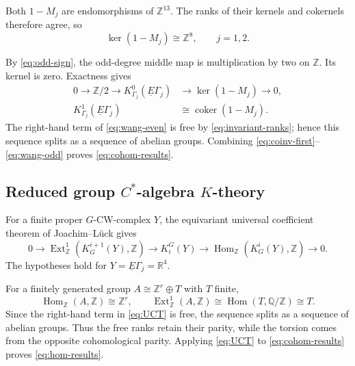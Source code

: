 \documentclass[11pt]{amsart}
\newcommand{\Z}{\mathbb Z}
\newcommand{\Q}{\mathbb Q}
\newcommand{\R}{\mathbb R}
\newcommand{\coker}{\operatorname{coker}}
\newcommand{\KC}[2]{K^{#1}_{#2}(\underline E#2)}
\theoremstyle{remark}
\numberwithin{equation}{section}
\begin{document}
Both $1-M_j$ are endomorphisms of $\Z^{13}$. The ranks of
their kernels and cokernels therefore agree, so
\begin{equation}\label{eq:invariant-ranks}
 \ker(1-M_j)\cong\Z^8,\qquad j=1,2.
\end{equation}

By \eqref{eq:odd-sign}, the odd-degree middle map is
multiplication by two on $\Z$. Its kernel is zero. Exactness gives
\begin{align}
 0\longrightarrow\Z/2\longrightarrow\KC{0}{\Gamma_j}
 &\longrightarrow\ker(1-M_j)\longrightarrow0,
 \label{eq:wang-even}\\
 \KC{1}{\Gamma_j}&\cong\coker(1-M_j).
 \label{eq:wang-odd}
\end{align}
The right-hand term of \eqref{eq:wang-even} is free by \eqref{eq:invariant-ranks}; hence this sequence splits as a sequence of abelian groups. Combining \eqref{eq:coinv-first}--\eqref{eq:wang-odd} proves
\eqref{eq:cohom-results}.

\subsection{Reduced group \texorpdfstring{$C^*$}{C-star}-algebra
\texorpdfstring{$K$}{K}-theory}


For a finite proper $G$-CW-complex $Y$, the equivariant universal coefficient theorem of Joachim--L\"uck \cite[Theorem~0.3, equation~(0.5)]{JL} gives
\begin{equation}\label{eq:UCT}
 0\longrightarrow
 \operatorname{Ext}^1_{\Z}(K_G^{i+1}(Y),\Z)
 \longrightarrow K_i^G(Y)
 \longrightarrow\operatorname{Hom}_{\Z}(K_G^i(Y),\Z)
 \longrightarrow0.
\end{equation}
The hypotheses hold for $Y=\underline E\Gamma_j=\R^4$.

For a finitely generated group $A\cong\Z^r\oplus T$ with $T$
finite,
\[
 \operatorname{Hom}_{\Z}(A,\Z)\cong\Z^r,
 \qquad\operatorname{Ext}^1_{\Z}(A,\Z)
 \cong\operatorname{Hom}(T,\Q/\Z)\cong T.
\]
Since the right-hand term in \eqref{eq:UCT} is free, the sequence splits as a sequence of abelian groups. Thus the free ranks retain their parity, while the torsion comes from the opposite cohomological parity. Applying \eqref{eq:UCT} to \eqref{eq:cohom-results} proves \eqref{eq:hom-results}.
\end{document}

